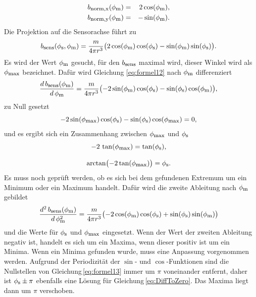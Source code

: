 \begin{eqnarray}
    b_{\textrm{\footnotesize{norm,x}}}(\phi_{\textrm{\footnotesize{m}}}) &=& 2  \cos(\phi_{\textrm{\footnotesize{m}}}),
    \label{eq:magNorm2DX}\\
    b_{\textrm{\footnotesize{norm,y}}}(\phi_{\textrm{\footnotesize{m}}}) &=& - \sin(\phi_{\textrm{\footnotesize{m}}}).
    \label{eq:magNorm2DY}\\
\end{eqnarray}
Die Projektion auf die Sensorachse führt zu
\begin{equation}
    b_{\textrm{\footnotesize{sens}}}(\phi_{\textrm{\footnotesize{s}}},\phi_{\textrm{\footnotesize{m}}})= \frac{ m }{4 \pi r^3} \big( 2  \cos(\phi_{\textrm{\footnotesize{m}}})  \cos(\phi_{\textrm{\footnotesize{s}}}) - \sin(\phi_{\textrm{\footnotesize{m}}})  \sin(\phi_{\textrm{\footnotesize{s}}}) \big).
    \label{eq:formel12}
\end{equation}
Es wird der Wert $\phi_{\textrm{\footnotesize{m}}}$ gesucht, für den $b_{\textrm{\footnotesize{sens}}}$ maximal wird, dieser Winkel wird als $\phi_{\textrm{\footnotesize{max}}}$ bezeichnet. Dafür wird Gleichung \ref{eq:formel12} nach $\phi_{\textrm{\footnotesize{m}}}$ differenziert
\begin{equation}
    \frac{d\,b_{\textrm{\footnotesize{sens}}}(\phi_{\textrm{\footnotesize{m}}})}{d\,\phi_{\textrm{\footnotesize{m}}}}=\frac{ m }{4 \pi r^3} \bigl( -2 \sin(\phi_{\textrm{\footnotesize{m}}})\cos(\phi_{\textrm{\footnotesize{s}}})-\sin(\phi_{\textrm{\footnotesize{s}}})  \cos(\phi_{\textrm{\footnotesize{m}}})\bigr),
    \label{eq:formel13}
\end{equation}
zu Null gesetzt
\begin{equation}
    -2 \sin(\phi_{\textrm{\footnotesize{max}}})\cos(\phi_{\textrm{\footnotesize{s}}})-\sin(\phi_{\textrm{\footnotesize{s}}})  \cos(\phi_{\textrm{\footnotesize{max}}}) = 0,
    \label{eq:DiffToZero}
\end{equation}
und es ergibt sich ein Zusammenhang zwischen $\phi_{\textrm{\footnotesize{max}}}$ und $\phi_{\textrm{\footnotesize{s}}}$
\begin{equation}
    -2\,\tan(\phi_{\textrm{\footnotesize{max}}})= \tan(\phi_{\textrm{\footnotesize{s}}}),
    \label{eq:relMaxS}
\end{equation}

\begin{equation}
    \arctan\bigl(-2 \tan(\phi_{\textrm{\footnotesize{max}}})\bigr) = \phi_{\textrm{\footnotesize{s}}}.
\end{equation}
Es muss noch geprüft werden, ob es sich bei dem gefundenen Extremum um ein Minimum oder ein Maximum handelt. Dafür wird die zweite Ableitung nach $\phi_{\textrm{\footnotesize{m}}}$ gebildet
\begin{equation}
    \frac{d^2\,b_{\textrm{\footnotesize{sens}}}(\phi_{\textrm{\footnotesize{m}}})}{d\,\phi_{\textrm{\footnotesize{m}}}^2}=\frac{ m }{4 \pi r^3}\bigl( -2 \cos(\phi_{\textrm{\footnotesize{m}}})\cos(\phi_{\textrm{\footnotesize{s}}})+\sin(\phi_{\textrm{\footnotesize{s}}})  \sin(\phi_{\textrm{\footnotesize{m}}})\bigr)
\end{equation}
und die Werte für $\phi_{\textrm{\footnotesize{s}}}$ und $\phi_{\textrm{\footnotesize{max}}}$ eingesetzt. Wenn der Wert der zweiten Ableitung negativ ist, handelt es sich um ein Maxima, wenn dieser positiv ist um ein Minima. Wenn ein Minima gefunden wurde, muss eine Anpassung vorgenommen werden. Aufgrund der Periodizität der $\sin$- und $\cos$-Funktionen sind die Nullstellen von Gleichung\,\ref{eq:formel13} immer um $\pi$ voneinander entfernt, daher ist $\phi_{\textrm{\footnotesize{s}}}\pm\pi$ ebenfalls eine Lösung für Gleichung\,\ref{eq:DiffToZero}. Das Maxima liegt dann um $\pi$ verschoben.
    
